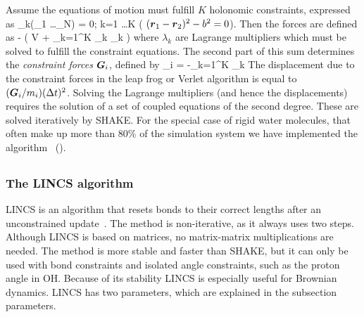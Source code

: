 Assume the equations of motion must fulfill $K$ holonomic constraints,
expressed as
\beq
\sigma_k(_1 \ldots {}_N) = 0; \;\; k=1 \ldots K
\eeq
({\eg} $(\mbox{\boldmath ${r}$}_1 - \mbox{\boldmath ${r}$}_2)^2 - b^2 = 0$). 
Then the forces are defined as 
\beq
-  \left( V + \sum_{k=1}^K \lambda_k
\sigma_k \right)
\eeq
where $\lambda_k$ are Lagrange multipliers which must be solved to
fulfill the constraint equations. The second part of this sum
determines the {\em constraint forces} $\mbox{\boldmath ${G}$}_i$, defined by
\beq
{}_i = -\sum_{k=1}^K \lambda_k 
\eeq
The displacement due to the constraint forces in the leap frog or
Verlet algorithm is equal to $(\mbox{\boldmath ${G}$}_i/m_i)({\Delta t})^2$. Solving the
Lagrange multipliers (and hence the displacements) requires the
solution of a set of coupled equations of the second degree. These are
solved iteratively by SHAKE.
For the special case of rigid water molecules, that often make up more
than 80\% of the simulation system we have implemented the 
algorithm~\cite{Miyamoto92} ().


\newcommand{\fs}[1]{\begin{equation} \label{eqn:#1}}
\newcommand{\fe}{\end{equation}}
\newcommand{\p}{\partial}
\newcommand{\Bm}{\ve{B}}
\newcommand{\M}{\ve{M}}
\newcommand{\iM}{\M^{-1}}
\newcommand{\Tm}{\ve{T}}
\newcommand{\Sm}{\ve{S}}
\newcommand{\fo}{\ve{f}}
\newcommand{\con}{\ve{g}}
\newcommand{\lenc}{\ve{d}}

\subsection{}

\subsubsection*{The LINCS algorithm}
LINCS is an algorithm that resets bonds to their correct lengths
after an unconstrained update~\cite{Hess97}. 
The method is non-iterative, as it always uses two steps.
Although LINCS is based on matrices, no matrix-matrix multiplications are 
needed. The method is more stable and faster than SHAKE, 
but it can only be used with bond constraints and 
isolated angle constraints, such as the proton angle in OH. 
Because of its stability LINCS is especially useful for Brownian dynamics. 
LINCS has two parameters, which are explained in the subsection parameters.
 
